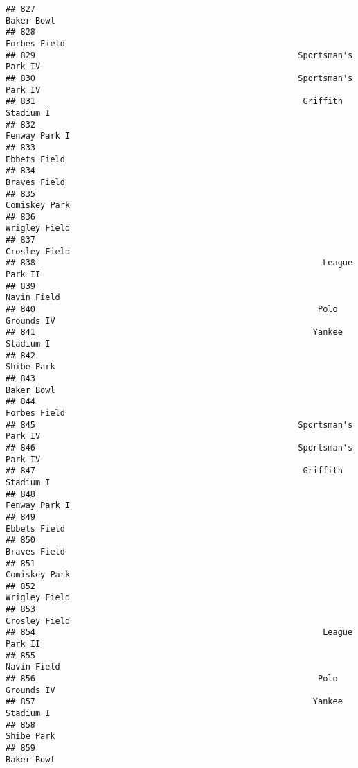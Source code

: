 \documentclass[]{article}
\begin{document}
\begin{verbatim}
## 827                                                              Baker Bowl
## 828                                                            Forbes Field
## 829                                                     Sportsman's Park IV
## 830                                                     Sportsman's Park IV
## 831                                                      Griffith Stadium I
## 832                                                           Fenway Park I
## 833                                                            Ebbets Field
## 834                                                            Braves Field
## 835                                                           Comiskey Park
## 836                                                           Wrigley Field
## 837                                                           Crosley Field
## 838                                                          League Park II
## 839                                                             Navin Field
## 840                                                         Polo Grounds IV
## 841                                                        Yankee Stadium I
## 842                                                              Shibe Park
## 843                                                              Baker Bowl
## 844                                                            Forbes Field
## 845                                                     Sportsman's Park IV
## 846                                                     Sportsman's Park IV
## 847                                                      Griffith Stadium I
## 848                                                           Fenway Park I
## 849                                                            Ebbets Field
## 850                                                            Braves Field
## 851                                                           Comiskey Park
## 852                                                           Wrigley Field
## 853                                                           Crosley Field
## 854                                                          League Park II
## 855                                                             Navin Field
## 856                                                         Polo Grounds IV
## 857                                                        Yankee Stadium I
## 858                                                              Shibe Park
## 859                                                              Baker Bowl

\end{verbatim}
\end{document}
